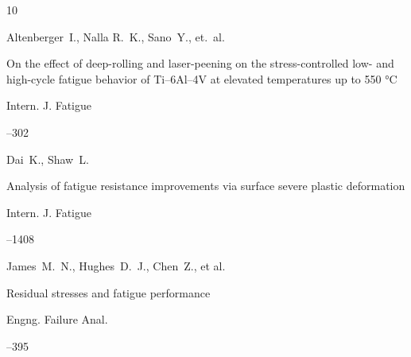 


\begin{thebibliography}{10}





\by Altenberger~I., Nalla R.~K., Sano~Y., et.~al.

\paper On the effect of deep-rolling and laser-peening on the stress-controlled low- and high-cycle fatigue behavior of Ti--6Al--4V at elevated temperatures up to 550 °C

\jour Intern. J. Fatigue



--302






\by Dai~K., Shaw~L.

\paper Analysis of fatigue resistance improvements via surface severe plastic deformation

\jour Intern. J. Fatigue




--1408






\by James~M.~N., Hughes~D.~J., Chen~Z., et al.

\paper Residual stresses and fatigue performance

\jour Engng. Failure Anal.




--395







\end{thebibliography}
